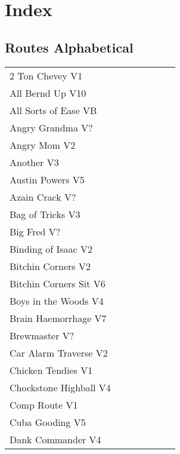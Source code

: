 \chapter{Index}
\lhead{\textcolor{\chapterColor}{\rule[-2pt]{\textwidth}{15pt}}}
\section{Routes Alphabetical}
\begin{center}
\begin{supertabular}{p{0.65\linewidth}r}
2 Ton Chevey V1 & \pageref{rt:2 Ton Chevey} \\
All Bernd Up V10 & \pageref{rt:All Bernd Up} \\
All Sorts of Ease VB & \pageref{rt:All Sorts of Ease} \\
Angry Grandma V? & \pageref{rt:Angry Grandma} \\
Angry Mom V2 & \pageref{rt:Angry Mom} \\
Another V3 & \pageref{rt:Another} \\
Austin Powers V5 & \pageref{rt:Austin Powers} \\
Azain Crack V? & \pageref{rt:Azain Crack} \\
Bag of Tricks V3 & \pageref{vr:Bag of Tricks} \\
Big Fred V? & \pageref{rt:Big Fred} \\
Binding of Isaac V2 & \pageref{rt:Binding of Isaac} \\
Bitchin Corners V2 & \pageref{rt:Bitchin Corners} \\
Bitchin Corners Sit V6 & \pageref{vr:Bitchin Corners Sit} \\
Boys in the Woods V4 & \pageref{rt:Boys in the Woods} \\
Brain Haemorrhage V7 & \pageref{vr:Brain Haemorrhage} \\
Brewmaster V? & \pageref{rt:Brewmaster} \\
Car Alarm Traverse V2 & \pageref{rt:Car Alarm Traverse} \\
Chicken Tendies V1 & \pageref{rt:Chicken Tendies} \\
Chockstone Highball V4 & \pageref{rt:Chockstone Highball} \\
Comp Route V1 & \pageref{rt:Comp Route} \\
Cuba Gooding V5 & \pageref{rt:Cuba Gooding} \\
Dank Commander V4 & \pageref{rt:Dank Commander} \\

\end{supertabular}
\end{center}
